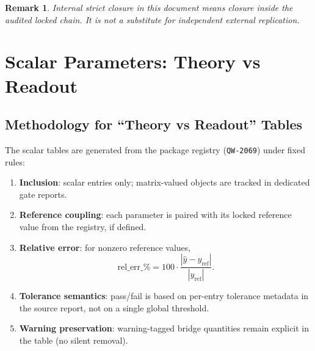 \documentclass[11pt,a4paper]{article}
\newcommand{\QW}[1]{\texttt{QW-#1}}
\newtheorem{remark}{Remark}
\begin{document}
\begin{remark}
Internal strict closure in this document means closure inside the audited locked chain. It is not a substitute for independent external replication.
\end{remark}

\section{Scalar Parameters: Theory vs Readout}
\subsection{Methodology for ``Theory vs Readout'' Tables}
The scalar tables are generated from the package registry (\QW{2069}) under fixed rules:
\begin{enumerate}[leftmargin=1.5em]
    \item \textbf{Inclusion}: scalar entries only; matrix-valued objects are tracked in dedicated gate reports.
    \item \textbf{Reference coupling}: each parameter is paired with its locked reference value from the registry, if defined.
    \item \textbf{Relative error}: for nonzero reference values,
    \[
    \mathrm{rel\_err\_\%} = 100\cdot \frac{\left|\widehat{y}-y_{\mathrm{ref}}\right|}{\left|y_{\mathrm{ref}}\right|}.
    \]
    \item \textbf{Tolerance semantics}: pass/fail is based on per-entry tolerance metadata in the source report, not on a single global threshold.
    \item \textbf{Warning preservation}: warning-tagged bridge quantities remain explicit in the table (no silent removal).
\end{enumerate}
\end{document}
